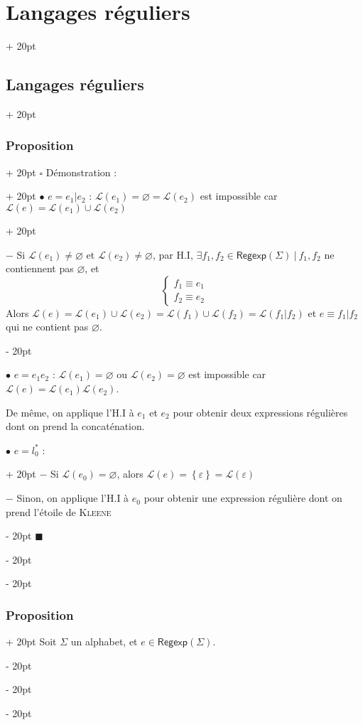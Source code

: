 \documentclass[a4paper, 12pt, twoside]{article}
\newcommand{\set}[1]{\left\{ #1 \right\}}
\newcommand{\ind}[1][20pt]{\advance\leftskip + #1}
\newcommand{\deind}[1][20pt]{\advance\leftskip - #1}
\newenvironment{indt}[2][20pt]{#2 \par \ind[#1]}{\par \deind} %
\newenvironment{proof}[1][{Démonstration :}]{\begin{indt}{$\square$ #1}}{$\blacksquare$ \end{indt}}
\newcommand{\Regexp}{\mathsf{Regexp}}
\begin{document}
\begin{indt}{\section{Langages réguliers}}
\begin{indt}{\subsection{Langages réguliers}}
\begin{indt}{\subsubsection{Proposition}}
\begin{proof}
\begin{indt}{$\bullet$ $e = e_1 | e_2$ : $\mathcal L(e_1) = \varnothing = \mathcal L(e_2)$ est impossible car $\mathcal L(e) = \mathcal L(e_1) \cup \mathcal L(e_2)$}
                        \vspace{12pt}
                        
                        $-$ Si $\mathcal L(e_1) \neq \varnothing$ et $\mathcal L(e_2) \neq \varnothing$, par H.I, $\exists f_1, f_2 \in \Regexp(\Sigma)\ |\ f_1, f_2$ ne contiennent pas $\varnothing$, et
                        \[
                            \begin{cases}
                                f_1 \equiv e_1
                                \\
                                f_2 \equiv e_2
                            \end{cases}
                        \]
                        Alors $\mathcal L(e) = \mathcal L(e_1) \cup \mathcal L(e_2) = \mathcal L(f_1) \cup \mathcal L(f_2) = \mathcal L(f_1 | f_2)$
                        et $e \equiv f_1 | f_2$ qui ne contient pas $\varnothing$.
                    \end{indt}

                    \vspace{6pt}
                    
                    $\bullet$ $e = e_1 e_2$ : $\mathcal L(e_1) = \varnothing$ ou $\mathcal L(e_2) = \varnothing$ est impossible car $\mathcal L(e) = \mathcal L(e_1) \mathcal L(e_2)$.

                    De même, on applique l'H.I à $e_1$ et $e_2$ pour obtenir deux expressions régulières dont on prend la concaténation.

                    \vspace{6pt}
                    
                    \begin{indt}{$\bullet$ $e = l_0^*$ :}
                        $-$ Si $\mathcal L(e_0) = \varnothing$, alors $\mathcal L(e) = \set \varepsilon = \mathcal L(\varepsilon)$

                        $-$ Sinon, on applique l'H.I à $e_0$ pour obtenir une expression régulière dont on prend l'étoile de \textsc{Kleene}
                    \end{indt}
                \end{proof}
            \end{indt}

            \vspace{12pt}
            
            \begin{indt}{\subsubsection{Proposition}}
                Soit $\Sigma$ un alphabet, et $e \in \Regexp(\Sigma)$.


\end{indt}
\end{indt}
\end{indt}
\end{document}
